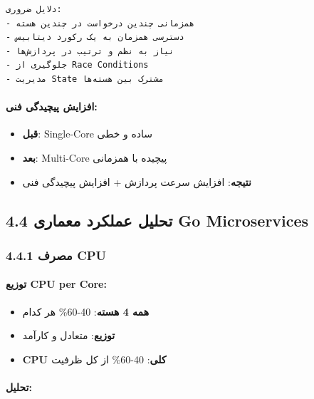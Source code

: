 \documentclass[
]{article}
\providecommand{\tightlist}{%
  \setlength{\itemsep}{0pt}\setlength{\parskip}{0pt}}
\begin{document}
\begin{verbatim}
دلایل ضروری:
- همزمانی چندین درخواست در چندین هسته
- دسترسی همزمان به یک رکورد دیتابیس
- نیاز به نظم و ترتیب در پردازش‌ها
- جلوگیری از Race Conditions
- مدیریت State مشترک بین هسته‌ها
\end{verbatim}

\paragraph{افزایش پیچیدگی
فنی:}\label{ux627ux641ux632ux627ux6ccux634-ux67eux6ccux686ux6ccux62fux6afux6cc-ux641ux646ux6cc}

\begin{itemize}
\tightlist
\item
  \textbf{قبل}: Single-Core ساده و خطی
\item
  \textbf{بعد}: Multi-Core پیچیده با همزمانی
\item
  \textbf{نتیجه}: افزایش سرعت پردازش + افزایش پیچیدگی فنی
\end{itemize}

\subsection{4.4 تحلیل عملکرد معماری Go
Microservices}\label{ux62aux62dux644ux6ccux644-ux639ux645ux644ux6a9ux631ux62f-ux645ux639ux645ux627ux631ux6cc-go-microservices}

\subsubsection{4.4.1 مصرف CPU}\label{ux645ux635ux631ux641-cpu-2}

\paragraph{توزیع CPU per
Core:}\label{ux62aux648ux632ux6ccux639-cpu-per-core-2}

\begin{itemize}
\tightlist
\item
  \textbf{همه 4 هسته}: 40-60\% هر کدام
\item
  \textbf{توزیع}: متعادل و کارآمد
\item
  \textbf{CPU کلی}: 40-60\% از کل ظرفیت
\end{itemize}

\paragraph{تحلیل:}\label{ux62aux62dux644ux6ccux644-4}
\end{document}
